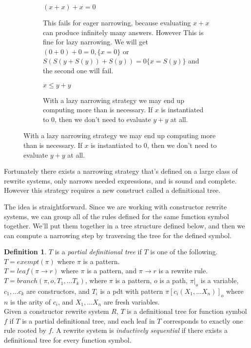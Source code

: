 \documentclass{book}
\theoremstyle{definition}
\newtheorem{definition}{Definition}[section]
\begin{document}
\begin{figure}[h]
  \begin{subfigure}{.45\textwidth}
      $(x + x) + x = 0$
    \caption{This fails for eager narrowing, because evaluating $x + x$ can produce infinitely many answers.
             However This is fine for lazy narrowing. We will get
             $(0 + 0) + 0 = 0, \{x = 0\}$
             or $S(S(y + S(y)) + S(y)) = 0 \{x = S(y)\}$
             and the second one will fail.}
  \end{subfigure}
  \hspace{.05\textwidth}
  \begin{subfigure}{.45\textwidth}
      $x \le y + y$
    \caption{With a lazy narrowing strategy we may end up computing more than is necessary.
             If $x$ is instantiated to $0$, then we don't need to evaluate $y + y$ at all.}
  \end{subfigure}
    \label{NarrowingComp}
\end{figure}


Fortunately there exists a narrowing strategy that's defined on a large class of rewrite systems,
only narrows needed expressions, and is sound and complete.
However this strategy requires a new construct called a definitional tree.

The idea is straightforward.  Since we are working with constructor rewrite systems,
we can group all of the rules defined for the same function symbol together.
We'll put them together in a tree structure defined below, and 
then we can compute a narrowing step by traversing the tree for the defined symbol.


\theoremstyle{definition}
\begin{definition}
    $T$ is a \textit{partial definitional tree} if $T$ is one of the following.\\
    $T = exempt(\pi)$ where $\pi$ is a pattern.\\
    $T = leaf(\pi \to r)$ where $\pi$ is a pattern, and $\pi \to r$ is a rewrite rule.\\
    $T = branch(\pi, o, T_1, \ldots T_k)$, where $\pi$ is a pattern,
    $o$ is a path,
    $\pi\vert_o$ is a variable,
    $c_1,\ldots c_k$ are constructors,
    and $T_i$ is a pdt with pattern $\pi[c_i(X_1,\ldots X_n)]_o$ where $n$ is the arity of $c_i$,
    and $X_1,\ldots X_n$ are fresh variables.\\
    $\ $\\
    Given a constructor rewrite system $R$,
    $T$ is a definitional tree for function symbol $f$ if
    $T$ is a partial definitional tree, and each leaf in $T$
    corresponds to exactly one rule rooted by $f$.
    A rewrite system is \textit{inductively sequential} 
    if there exists a definitional tree for every function symbol.
\end{definition}
\end{document}

